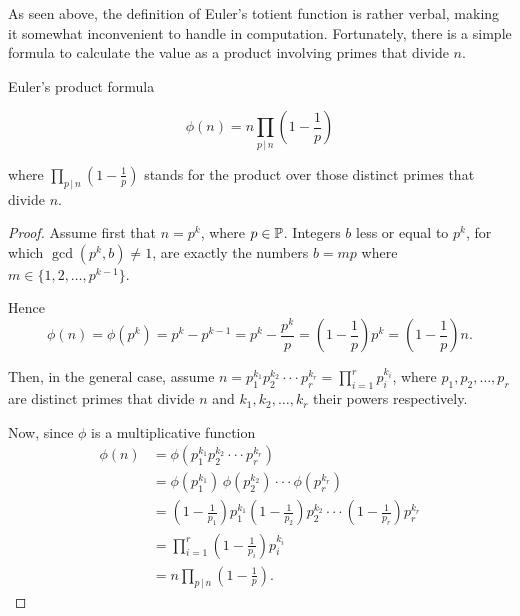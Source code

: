 \documentclass{article}
\begin{document}
As seen above, the definition of Euler's totient function is rather verbal, making it somewhat inconvenient to handle in computation. Fortunately, there is a simple formula to calculate the value as a product involving primes that divide $n$.

\begin{theorem}
Euler's product formula
\label{thm:product}


\begin{equation*}
    \phi(n) = n \prod_{p \,\vert\, n} \left(1 - \frac{1}{p}\right)
\end{equation*}

where $\prod_{p \,\vert\, n} \left(1 - \frac{1}{p}\right)$ stands for the product over those distinct primes that divide $n$.

\begin{proof}

Assume first that $n = p^k$, where $p\in \mathbb{P}$. Integers $b$ less or equal to $p^k$, for which $\gcd(p^k,b)\not=1$, are exactly the numbers $b=mp$ where $m\in \{1,2,\dots,p^{k-1}\}$.

Hence
\begin{equation*}
    \phi(n)=\phi(p^k)=p^k-p^{k-1}=p^k-\frac{p^k}{p}=\left(1-\frac{1}{p}\right)p^k=\left(1-\frac{1}{p}\right)n.
\end{equation*}

Then, in the general case, assume $n=p_1^{k_1} p_2^{k_2} \cdot \cdot \cdot p_r^{k_r}=\prod_{i=1}^r p_i^{k_i}$, where $p_1,p_2,\dots,p_r$ are distinct primes that divide $n$ and $k_1,k_2,\dots,k_r$ their powers respectively. 


Now, since $\phi$ is a multiplicative function
\begin{align*}
    \phi(n) & = \phi(p_1^{k_1} p_2^{k_2} \cdot \cdot \cdot p_r^{k_r})\\
    & = \phi(p_1^{k_1})\,\phi(p_2^{k_2}) \cdot \cdot \cdot \phi(p_r^{k_r})\\
    & = \left(1-\frac{1}{p_1}\right)p_1^{k_1} \left(1-\frac{1}{p_2}\right)p_2^{k_2} \cdot \cdot \cdot \left(1-\frac{1}{p_r}\right)p_r^{k_r}\\
    & = \prod_{i=1}^r \left(1-\frac{1}{p_i}\right) p_i^{k_i}\\
    & = n \prod_{p \,\vert\, n} \left(1 - \frac{1}{p}\right).
\end{align*}

\end{proof}

\end{theorem}
\end{document}
